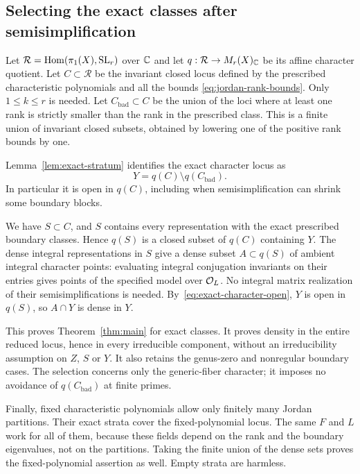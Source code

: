\subsection{Selecting the exact classes after semisimplification}

Let $\mathcal R=\operatorname{Hom}(\pi_1(X),\operatorname{SL}_r)$ over $\mathbb C$ and
let $q:\mathcal R\to M_r(X)_\mathbb C$ be its affine character quotient.
Let $C\subset\mathcal R$ be the invariant closed locus defined by
the prescribed characteristic polynomials and all the bounds
\eqref{eq:jordan-rank-bounds}.  Only $1\le k\le r$ is needed.
Let $C_{\mathrm{bad}}\subset C$ be the union of the loci where at
least one rank is strictly smaller than the rank in the prescribed
class.  This is a finite union of invariant closed subsets, obtained
by lowering one of the positive rank bounds by one.

Lemma~\ref{lem:exact-stratum} identifies the exact character locus as
\begin{equation}\label{eq:exact-character-open}
             Y=q(C)\setminus q(C_{\mathrm{bad}}).
\end{equation}
In particular it is open in $q(C)$, including when semisimplification
can shrink some boundary blocks.

We have $S\subset C$, and $S$ contains every representation with
the exact prescribed boundary classes.  Hence $q(S)$ is a closed
subset of $q(C)$ containing $Y$.  The dense integral representations
in $S$ give a dense subset $A\subset q(S)$ of ambient integral
character points: evaluating integral conjugation invariants on
their entries gives points of the specified model over $\mathcal O_L$.
No integral matrix realization of their semisimplifications is
needed.  By~\eqref{eq:exact-character-open}, $Y$ is open in $q(S)$,
so $A\cap Y$ is dense in $Y$.

This proves Theorem~\ref{thm:main} for exact classes.  It proves
density in the entire reduced locus, hence in every irreducible
component, without an irreducibility assumption on $Z$, $S$ or $Y$.
It also retains the genus-zero and nonregular boundary cases.
The selection concerns only the generic-fiber character; it imposes
no avoidance of $q(C_{\mathrm{bad}})$ at finite primes.

Finally, fixed characteristic polynomials allow only finitely many
Jordan partitions.  Their exact strata cover the fixed-polynomial
locus.  The same $F$ and $L$ work for all of them, because these
fields depend on the rank and the boundary eigenvalues, not on the
partitions.  Taking the finite union of the dense sets proves the
fixed-polynomial assertion as well.  Empty strata are harmless.

